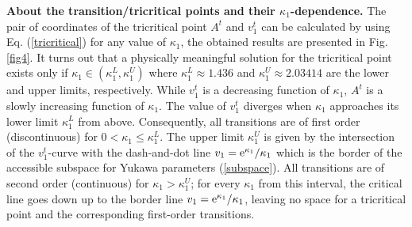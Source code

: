 \documentclass[12pt]{interact}
\theoremstyle{definition}
\begin{document}
\textbf{About the transition/tricritical points and their $\kappa_1$-dependence.} The pair of coordinates of the tricritical point $A^t$ and $v_1^t$ 
can be calculated by using Eq. (\ref{tricritical}) for any value of
$\kappa_1$, the obtained results are presented in Fig. \ref{fig4}.
It turns out that a physically meaningful solution for the tricritical point
exists only if $\kappa_1\in (\kappa_1^L,\kappa_1^U)$ where
$\kappa_1^L \approx 1.436$ and $\kappa_1^U\approx 2.03414$ are the lower and
upper limits, respectively.
While $v_1^t$ is a decreasing function of $\kappa_1$, $A^t$ is a slowly
increasing function of $\kappa_1$.
The value of $v_1^t$ diverges when $\kappa_1$ approaches its lower limit
$\kappa_1^L$ from above. 
Consequently, all transitions are of first order (discontinuous) for
$0<\kappa_1\le \kappa_1^L$.
The upper limit $\kappa_1^U$ is given by the intersection of the $v_1^t$-curve
with the dash-and-dot line $v_1={\rm e}^{\kappa_1}/\kappa_1$ which is the border
of the accessible subspace for Yukawa parameters (\ref{subspace}). 
All transitions are of second order (continuous) for $\kappa_1>\kappa_1^U$;
for every $\kappa_1$ from this interval, the critical line goes down up to
the border line $v_1={\rm e}^{\kappa_1}/\kappa_1$, leaving no space for
a tricritical point and the corresponding first-order transitions.
\end{document}
